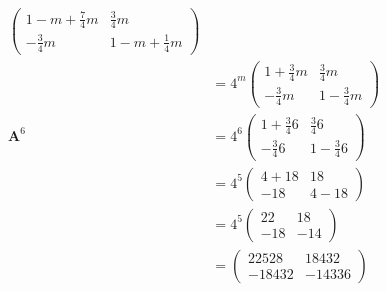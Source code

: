 \documentclass{article}
\begin{document}
\begin{align*}
\begin{pmatrix}
                                                   1 - m + \frac{7}{4} m & \frac{3}{4} m         \\
                                                   -\frac{3}{4} m        & 1 - m + \frac{1}{4} m
                                                 \end{pmatrix}             \\
                                         & = 4^m \begin{pmatrix}
                                                   1 + \frac{3}{4} m & \frac{3}{4} m     \\
                                                   -\frac{3}{4} m    & 1 - \frac{3}{4} m
                                                 \end{pmatrix}                     \\
  \mathbf{A}^6                           & = 4^6 \begin{pmatrix}
                                                   1 + \frac{3}{4} 6 & \frac{3}{4} 6     \\
                                                   -\frac{3}{4} 6    & 1 - \frac{3}{4} 6
                                                 \end{pmatrix}                     \\
                                         & = 4^5 \begin{pmatrix}
                                                   4 + 18 & 18     \\
                                                   -18    & 4 - 18
                                                 \end{pmatrix}                                           \\
                                         & = 4^5 \begin{pmatrix}
                                                   22  & 18  \\
                                                   -18 & -14
                                                 \end{pmatrix}                                            \\
                                         & = \begin{pmatrix}
                                               22528  & 18432  \\
                                               -18432 & -14336
                                             \end{pmatrix}
\end{align*}
\end{document}
